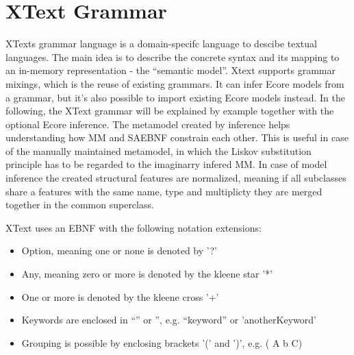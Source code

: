 \section{XText Grammar}
XTexts grammar language is a domain-specifc language to descibe textual languages. The main idea is to describe the concrete syntax and its mapping to an in-memory representation - the ``semantic model''. Xtext supports grammar mixings, which is the reuse of existing grammars. It can infer Ecore models from a grammar, but it's also possible to import existing Ecore models instead. In the following, the XText grammar will be explained by example together with the optional Ecore  inference. The metamodel created by inference helps understanding how MM and SAEBNF constrain each other. This is useful in case of the manually maintained metamodel, in which the Liskov substitution principle has to be regarded to the imaginarry infered MM. In case of model inference the created structural features are normalized, meaning if all subclasses share a features with the same name, type and multiplicty they are merged together in the common superclass.

XText uses an EBNF with the following notation extensions:
\begin{itemize}
	\item Option, meaning one or none is denoted by '?'
	\item Any, meaning zero or more is denoted by the kleene star '*'
	\item One or more is denoted by the kleene cross '+'
	\item Keywords are enclosed in ``'' or '', e.g. ``keyword'' or 'anotherKeyword'
	\item Grouping is possible by enclosing brackets '(' and  ')', e.g.  ( A b C)
\end{itemize}

